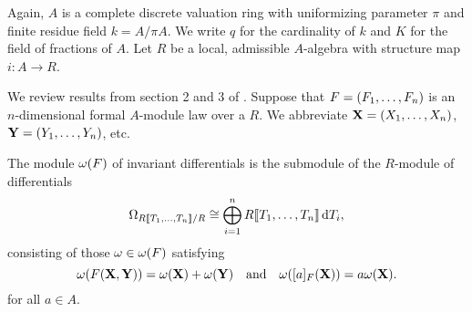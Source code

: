 Again, $A$ is a complete discrete valuation ring with uniformizing parameter 
$\pi$ and finite residue field $k = A/\pi A$. We write $q$ for the cardinality of 
$k$ and $K$ for the field of fractions of $A$. Let $R$ be a local,
admissible $A$-algebra with structure map $i: A \to R$.

We review results from section
2 and 3 of \cite{hopkins1994equivariant}. 
Suppose that ${F} = (F_1, \dots, F_n)$ is an $n$-dimensional formal $A$-module
law over a $R$. We abbreviate $\mathbf{X} = (X_1, \dots, X_n)$, $\mathbf{Y} = (Y_1,
\dots, Y_n)$, etc.

\begin{defi}
  The module $\omega({F})$ of invariant differentials is the submodule of the
  $R$-module of differentials
  \begin{equation*}
    \Omega_{R\llbracket T_1, \dots, T_n \rrbracket/R} \cong \bigoplus_{i=1}^n R\llbracket T_1, \dots, T_n
    \rrbracket \, \mathrm{d} T_i,
  \end{equation*}
  consisting of those $\omega \in \omega({F})$ satisfying
  \begin{equation}\label{eq:diffcond}
    \omega({F}(\mathbf{X},\mathbf{Y})) = \omega(\mathbf{X}) + \omega(\mathbf{Y})\quad \text{and} \quad
    \omega([a]_{F}(\mathbf{X})) = a\omega(\mathbf{X}).
  \end{equation} 
  for all $a \in A$. 
\end{defi}

